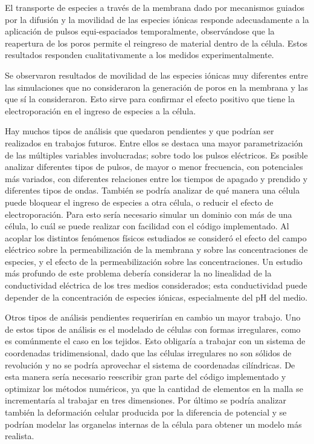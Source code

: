 El transporte de especies a través de la membrana dado por mecanismos guiados por la difusión y la movilidad de las especies iónicas responde adecuadamente a la aplicación de pulsos equi-espaciados temporalmente, observándose que la reapertura de los poros permite el reingreso de material dentro de la célula. Estos resultados responden cualitativamente a los medidos experimentalmente.

Se observaron resultados de movilidad de las especies iónicas muy diferentes entre las simulaciones que no consideraron la generación de poros en la membrana y las que sí la consideraron. Esto sirve para confirmar el efecto positivo que tiene la electroporación en el ingreso de especies a la célula.

Hay muchos tipos de análisis que quedaron pendientes y que podrían ser realizados en trabajos futuros. Entre ellos se destaca una mayor parametrización de las múltiples variables involucradas; sobre todo los pulsos eléctricos. Es posible analizar diferentes tipos de pulsos, de mayor o menor frecuencia, con potenciales más variados, con diferentes relaciones entre los tiempos de apagado y prendido y diferentes tipos de ondas. También se podría analizar de qué manera una célula puede bloquear el ingreso de especies a otra célula, o reducir el efecto de electroporación. Para esto sería necesario simular un dominio con más de una célula, lo cuál se puede realizar con facilidad con el código implementado. Al acoplar los distintos fenómenos físicos estudiados se consideró el efecto del campo eléctrico sobre la permeabilización de la membrana y sobre las concentraciones de especies, y el efecto de la permeabilización sobre las concentraciones. Un estudio más profundo de este problema debería considerar la no linealidad de la conductividad eléctrica de los tres medios considerados; esta conductividad puede depender de la concentración de especies iónicas, especialmente del pH del medio.

Otros tipos de análisis pendientes requerirían en cambio un mayor trabajo. Uno de estos tipos de análisis es el modelado de células con formas irregulares, como es comúnmente el caso en los tejidos. Esto obligaría a trabajar con un sistema de coordenadas tridimensional, dado que las células irregulares no son sólidos de revolución y no se podría aprovechar el sistema de coordenadas cilíndricas. De esta manera sería necesario reescribir gran parte del código implementado y optimizar los métodos numéricos, ya que la cantidad de elementos en la malla se incrementaría al trabajar en tres dimensiones. Por último se podría analizar también la deformación celular producida por la diferencia de potencial y se podrían modelar las organelas internas de la célula para obtener un modelo más realista.
